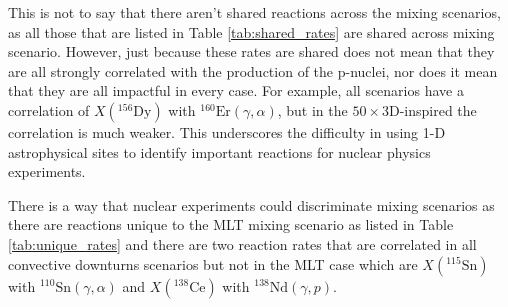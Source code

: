 This is not to say that there aren't shared reactions across the mixing scenarios, as all those that are listed in Table \ref{tab:shared_rates} are shared across mixing scenario.
However, just because these rates are shared does not mean that they are all strongly correlated with the production of the p-nuclei, nor does it mean that they are all impactful in every case.
For example, all scenarios have a correlation of $X(^{156}\mathrm{Dy})$ with $^{160}\mathrm{Er}(\gamma,\alpha)$, but in the $50\times$3D-inspired the correlation is much weaker.
This underscores the difficulty in using 1-D astrophysical sites to identify important reactions for nuclear physics experiments.

There is a way that nuclear experiments could discriminate mixing scenarios as there are reactions unique to the MLT mixing scenario as listed in Table \ref{tab:unique_rates} and there are two reaction rates that are correlated in all convective downturns scenarios but not in the MLT case which are  $X(^{115}\mathrm{Sn})$ with $^{110}\mathrm{Sn}(\gamma,\alpha)$ and $X(^{138}\mathrm{Ce})$ with $^{138}\mathrm{Nd}(\gamma,p)$. 

